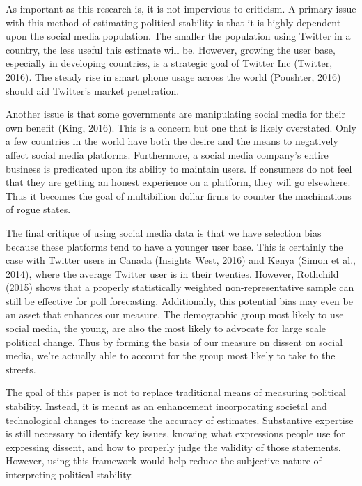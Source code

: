 \documentclass[12pt]{article}
\begin{document}
\begin{spacing}{1.5}

As important as this research is, it is not impervious to criticism. A primary issue with this method of estimating political stability is that it is highly dependent upon the social media population. The smaller the population using Twitter in a country, the less useful this estimate will be. However, growing the user base, especially in developing countries, is a strategic goal of Twitter Inc (Twitter, 2016). The steady rise in smart phone usage across the world (Poushter, 2016) should aid Twitter's market penetration. 

Another issue is that some governments are manipulating social media for their own benefit (King, 2016). This is a concern but one that is likely overstated. Only a few countries in the world have both the desire and the means to negatively affect social media platforms. Furthermore, a social media company's entire business is predicated upon its ability to maintain users. If consumers do not feel that they are getting an honest experience on a platform, they will go elsewhere. Thus it becomes the goal of multibillion dollar firms to counter the machinations of rogue states. 

The final critique of using social media data is that we have selection bias because these platforms tend to have a younger user base. This is certainly the case with Twitter users in Canada (Insights West, 2016) and Kenya (Simon et al., 2014), where the average Twitter user is in their twenties. However, Rothchild (2015) shows that a properly statistically weighted non-representative sample can still be effective for poll forecasting. Additionally, this potential bias may even be an asset that enhances our measure. The demographic group most likely to use social media, the young, are also the most likely to advocate for large scale political change. Thus by forming the basis of our measure on dissent on social media, we're actually able to account for the group most likely to take to the streets.
    
The goal of this paper is not to replace traditional means of measuring political stability. Instead, it is meant as an enhancement incorporating societal and technological changes to increase the accuracy of estimates. Substantive expertise is still necessary to identify key issues, knowing what expressions people use for expressing dissent, and how to properly judge the validity of those statements. However, using this framework would help reduce the subjective nature of interpreting political stability. 


\end{spacing}

\pagebreak




\nocite{*}
\end{document}
